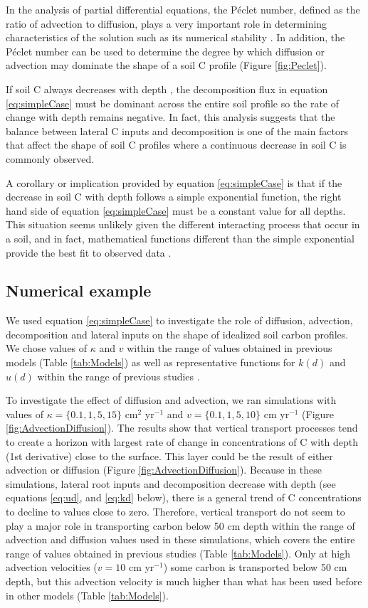 \documentclass[11pt, oneside, a4paper]{article}   	%
\begin{document}
In the analysis of partial differential equations, the Péclet number, defined as the ratio of advection to diffusion, plays a very important role in determining characteristics of the solution such as its numerical stability \citep{LeVeque2007}. In addition, the Péclet number can be used to determine the degree by which diffusion or advection may dominate the shape of a soil C profile (Figure \ref{fig:Peclet}). 

If soil C always decreases with depth \citep{Jobbagy2000}, the decomposition flux in equation \ref{eq:simpleCase} must be dominant across the entire soil profile so the rate of change with depth remains negative. In fact, this analysis suggests that the balance between lateral C inputs and decomposition is one of the main factors that affect the shape of soil C profiles where a continuous decrease in soil C is commonly observed. 

A corollary or implication provided by equation \ref{eq:simpleCase} is that if the decrease in soil C with depth follows a simple exponential function, the right hand side of equation \ref{eq:simpleCase} must be a constant value for all depths. This situation seems unlikely given the different interacting process that occur in a soil, and in fact, mathematical functions different than the simple exponential provide the best fit to observed data \citep{Jobbagy2000}.

\subsection{Numerical example} \label{sec:ex1}
We used equation \ref{eq:simpleCase} to investigate the role of diffusion, advection, decomposition and lateral inputs on the shape of idealized soil carbon profiles. 
We chose values of $\kappa$ and $v$ within the range of values obtained in previous models (Table \ref{tab:Models}) as well as representative functions for $k(d)$ and $u(d)$ within the range of previous studies \citep[e.g.][]{Elzein1995, Jackson1996, Jackson1997,Koven2013BGS}.

To investigate the effect of diffusion and advection, we ran simulations with values of $\kappa = \{0.1, 1, 5, 15\}$ cm$^2$ yr$^{-1}$ and $v = \{0.1, 1, 5, 10 \}$ cm yr$^{-1}$ (Figure \ref{fig:AdvectionDiffusion}). The results show that vertical transport processes tend to create a horizon with largest rate of change in concentrations of C with depth (1st derivative) close to the surface. This layer could be the result of either advection or diffusion (Figure \ref{fig:AdvectionDiffusion}). Because in these simulations, lateral root inputs and decomposition decrease with depth (see equations \ref{eq:ud}, and \ref{eq:kd} below), there is a general trend of C concentrations to decline to values close to zero. Therefore, vertical transport do not seem to play a major role in transporting carbon below 50 cm depth within the range of advection and diffusion values used in these simulations, which covers the entire range of values obtained in previous studies (Table \ref{tab:Models}). Only at high advection velocities ($v=10$ cm yr$^{-1}$) some carbon is transported below 50 cm depth, but this advection velocity is much higher than what has been used before in other models (Table \ref{tab:Models}).
\end{document}
